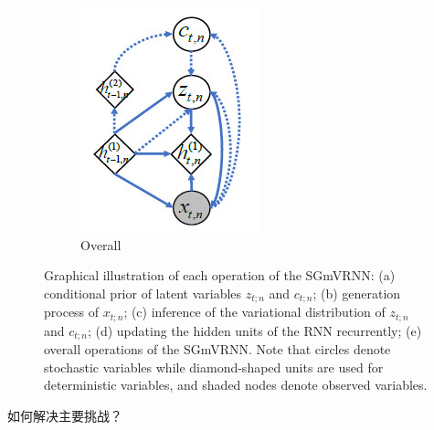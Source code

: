 \documentclass[letterpaper,12pt]{article}
\begin{document}
\begin{figure}[htbp]
\begin{subfigure}{0.19\textwidth}
				\includegraphics[width=\linewidth]{Switching/Overall}
				\captionsetup{font=scriptsize}
				\caption{Overall}
				\label{fig: Overall}
			\end{subfigure}
			\captionsetup{font=scriptsize}
			\caption{
				\label{fig: Switching Mechanism} %
				Graphical illustration of each operation of the SGmVRNN: (a) conditional prior of latent variables $z_{t;n}$ and $c_{t;n}$; (b) generation process of $x_{t;n}$; (c) inference of the variational distribution of $z_{t;n}$ and $c_{t;n}$; (d) updating the hidden units of the RNN recurrently; (e) overall operations of the SGmVRNN. Note that circles denote stochastic variables while diamond-shaped units are used for deterministic variables, and shaded nodes denote observed variables.
			}
		\end{figure}
		
	如何解决主要挑战？
	
\end{document}
